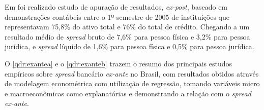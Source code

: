 \documentclass[
  12pt,
  12pt,
  openright,
  oneside,
  a4paper,
  chapter=TITLE,
  section=TITLE,
  subsection=TITLE,
  subsubsection=TITLE,
  english,
  portugues,
  sumario=tradicional]{abntex2}
\begin{document}
Em \textcite{fipecafi:2005} foi realizado estudo de apuração de resultados, \emph{ex-post}, baseado em demonstrações contábeis entre o 1º semestre de 2005 de instituições que representavam 75,8\% do ativo total e 76\% do total de crédito. Chegando a um resultado médio de \emph{spread} bruto de 7,6\% para pessoa física e 3,2\% para pessoa jurídica, e \emph{spread} líquido de 1,6\% para pessoa física e 0,5\% para pessoa jurídica.

O \autoref{qdr:exantea} e o \autoref{qdr:exanteb} trazem o resumo dos principais estudos empíricos sobre \emph{spread} bancário \emph{ex-ante} no Brasil, com resultados obtidos através de modelagem econométrica com utilização de regressão, tomando variáveis micro e macroeconômicas como explanatórias e demonstrando a relação com o \emph{spread ex-ante}.
\end{document}
